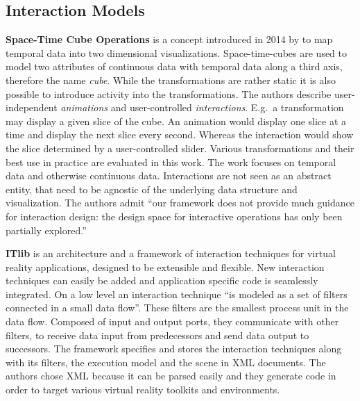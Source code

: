 
\subsection{Interaction Models}

\textbf{Space-Time Cube Operations}
is a concept introduced in 2014 by \textcite{Bach2014} to map temporal data into two dimensional visualizations.
Space-time-cubes are used to model two attributes of continuous data with temporal data along a third axis, therefore the name \emph{cube}.
While the transformations are rather static it is also possible to introduce activity into the transformations.
The authors describe user-independent \emph{animations} and user-controlled \emph{interactions}.
E.g.\ a transformation may display a given slice of the cube.
An animation would display one slice at a time and display the next slice every second.
Whereas the interaction would show the slice determined by a user-controlled slider.
Various transformations and their best use in practice are evaluated in this work.
The work focuses on temporal data and otherwise continuous data.
Interactions are not seen as an abstract entity, that need to be agnostic of the underlying data structure and visualization.
The authors admit ``our framework does not provide much guidance for interaction design: the design space for interactive operations has only been partially explored.''\cite[Other limitations, p.~15]{Bach2014}

\textbf{ITlib\cite{Figueroa2001}} is an architecture and a framework of interaction techniques for virtual reality applications, designed to be extensible and flexible.
New interaction techniques can easily be added and application specific code is seamlessly integrated.
On a low level an interaction technique ``is modeled as a set of filters connected in a small data flow''\cite[Basic concept, p.~2]{Figueroa2001}.
These filters are the smallest process unit in the data flow.
Composed of input and output ports, they communicate with other filters, to receive data input from predecessors and send data output to successors.
The framework specifies and stores the interaction techniques along with its filters, the execution model and the scene in XML documents.
The authors chose XML because it can be parsed easily and they generate code in order to target various virtual reality toolkits and environments.

